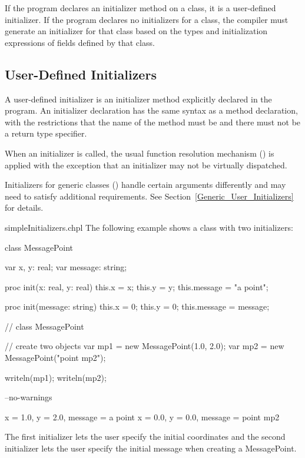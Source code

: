 If the program declares an initializer method on a class, it is a user-defined
initializer. If the program declares no initializers for a class, the compiler
must generate an initializer for that class based on the types and
initialization expressions of fields defined by that class.

\subsection{User-Defined Initializers}
\label{User_Defined_Initializers}

A user-defined initializer is an initializer method explicitly declared in the
program.  An initializer declaration has the same syntax as a method
declaration, with the restrictions that the name of the method must be
 and there must not be a return type specifier.

When an initializer is called, the usual function resolution mechanism
() is applied with the exception that an
initializer may not be virtually dispatched.

Initializers for generic classes () handle certain
arguments differently and may need to satisfy additional
requirements. See Section~\ref{Generic_User_Initializers} for details.

\begin{chapelexample}{simpleInitializers.chpl}
The following example shows a class with two initializers:
\begin{chapel}
class MessagePoint {
  var x, y: real;
  var message: string;

  proc init(x: real, y: real) {
    this.x = x;
    this.y = y;
    this.message = "a point";
  }

  proc init(message: string) {
    this.x = 0;
    this.y = 0;
    this.message = message;
  }
}  // class MessagePoint

// create two objects
var mp1 = new MessagePoint(1.0, 2.0);
var mp2 = new MessagePoint("point mp2");
\end{chapel}
\begin{chapelpost}
writeln(mp1);
writeln(mp2);
\end{chapelpost}
\begin{chapelcompopts}
--no-warnings
\end{chapelcompopts}
\begin{chapeloutput}
{x = 1.0, y = 2.0, message = a point}
{x = 0.0, y = 0.0, message = point mp2}
\end{chapeloutput}
The first initializer lets the user specify the initial coordinates
and the second initializer lets the user specify the initial message
when creating a MessagePoint.
\end{chapelexample}

